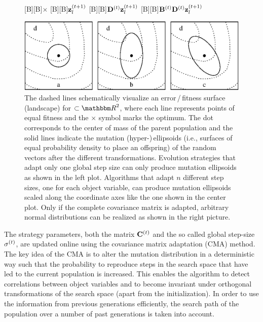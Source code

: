\begin{figure}
{
  [B][B]{\small $\times$}
  [B][B]{\small $\mathbf{z}_l^{(t+1)}$}
  [B][B]{\small $\mathbf{D}^{(t)}\mathbf{z}_l^{(t+1)}$}
  [B][B]{\small $\mathbf{B}^{(t)}\mathbf{D}^{(t)}\mathbf{z}_l^{(t+1)}$}
 \centerline{\includegraphics[width=.9\textwidth]{cmascheme.eps}}
}
\caption{\label{fig:cma}   The
  dashed lines schematically visualize an error\,/\,fitness surface
  (landscape) for $\subset{\mathbbm R}^2$, where each line
  represents points of equal fitness and the $\times$ symbol marks the
  optimum. The dot corresponds to the center of mass of the parent
  population and the solid lines indicate the mutation
  \mbox{(hyper-)}\,ellipsoids (i.e., surfaces of equal probability
  density to place an offspring) of the random vectors after the
  different transformations.
%
  Evolution strategies that adapt only one global step size can only
  produce mutation ellipsoids as shown in the left plot. Algorithms
  that adapt $n$ different step sizes, one for each object variable,
  can produce mutation ellipsoids scaled along the coordinate axes
  like the one shown in the center plot.  Only if the complete
  covariance matrix is adapted, arbitrary normal distributions can be
  realized as shown in the right picture.
}
\end{figure}
                                                                                
                                                                                
                                                                                
The strategy parameters, both the matrix ${\mathbf{C}}^{(t)}$ and the so
called global step-size $\sigma^{(t)}$, are updated online using the
covariance matrix adaptation (CMA) method.  The key idea of the CMA is
to alter the mutation distribution in a deterministic way such that
the probability to reproduce steps in the search space that have led
to the current population is increased.
%
This enables the algorithm to detect correlations between object variables
and to become invariant under orthogonal transformations of the search
space (apart from the initialization). In order to use the information
from previous generations efficiently, the search path of the
population over a number of past generations is taken into account.
                                                                                
